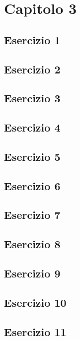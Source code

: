 \section{\textbf{Capitolo 3}}
\subsection{Esercizio 1}

\subsection{Esercizio 2}

\subsection{Esercizio 3}

\subsection{Esercizio 4}

\subsection{Esercizio 5}

\subsection{Esercizio 6}

\subsection{Esercizio 7}

\subsection{Esercizio 8}

\subsection{Esercizio 9}

\subsection{Esercizio 10}

\subsection{Esercizio 11}
